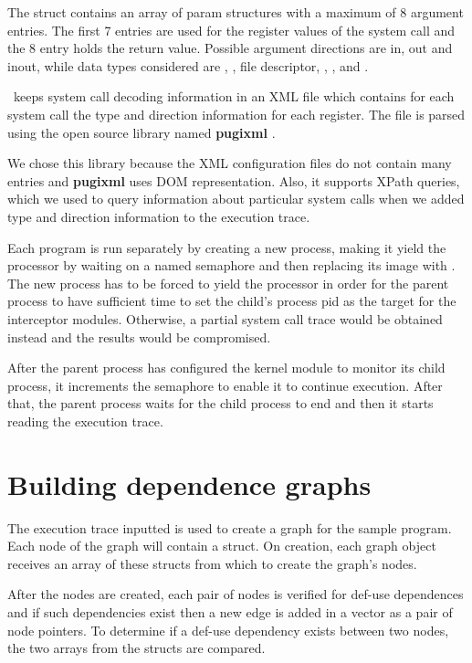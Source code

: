 The  struct contains an array of param structures with a maximum of 8 argument entries. The first 7 entries are used for the register values of the system call and the 8 entry holds the return value. Possible argument directions are  in, out and inout, while data types considered are , , file descriptor, , ,  and .

\project\ keeps system call decoding information in an XML file which contains for each system call the type and direction information for each register. The file is parsed using the open source library named \textbf{pugixml} \cite{pugixml-library}. 

We chose this library because the XML configuration files do not contain many entries and \textbf{pugixml} uses DOM representation. Also, it supports XPath queries, which we used to query information about particular system calls when we added type and direction information to the execution trace.


Each program is run separately by creating a new process, making it yield the processor by waiting on a named semaphore and then replacing its image with . The new process has to be forced to yield the processor in order for the parent process to have sufficient time to set the child’s process pid as the target for the interceptor modules. Otherwise, a partial system call trace would be obtained instead and the results would be compromised. 

After the parent process has configured the kernel module to monitor its child process, it increments the semaphore to enable it to continue execution. After that, the parent process waits for the child process to end and then it starts reading the execution trace.

\section{Building dependence graphs}
\label{fourth:dep-graphs}

The execution trace inputted is used to create a graph for the sample program. Each node of the graph will contain a  struct. On creation, each graph object receives an array of these structs from which to create the graph’s nodes.

After the nodes are created, each pair of nodes is verified for def-use dependences and if such dependencies exist then a new edge is added in a vector as a pair of node pointers. To determine if a def-use dependency exists between two nodes, the two  arrays from the  structs are compared.

